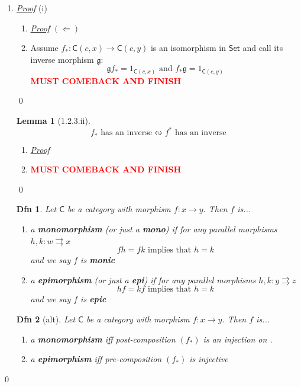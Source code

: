 \documentclass{article}
\theoremstyle{spacious}
\newtheorem*{dfn}{Dfn}
\newtheorem*{lem}{Lemma}
\newenvironment{pf}{\begin{enumerate} \item[] \textit{\underline{Proof}} }{\end{enumerate}\qed}
\renewcommand{\:}{\vcentcolon=} %
\begin{document}
\begin{pf}{(i)}
\begin{pf} \(\left(\Leftarrow\right)\)
    \item[] Assume  \(f_*:\mathsf{C}(c,x) \to \mathsf{C}(c,y)\) is an isomorphism in \(\mathsf{Set}\) and call its inverse morphism $\mathfrak{g}$:
    \[
    \mathfrak{g}f_*=1_{\mathsf{C}\left(c,x\right)} \text{ and } f_*\mathfrak{g}=1_{\mathsf{C}\left(c,y\right)}
    \]  
    {\textcolor{red}{\textbf{MUST COMEBACK AND FINISH}}}
\end{pf}

\begin{lem}[1.2.3.ii]
    \[
        f_* \text{ has an inverse} \leftrightsquigarrow f^* \text{ has an inverse}
    \]
\end{lem}

\begin{pf}{}
    \item[] {\textcolor{red}{\textbf{MUST COMEBACK AND FINISH}}}
\end{pf}

\begin{dfn} Let \(\mathsf{C}\) be a category with morphism \(f:x \to y\).  Then $f$ is...
    \begin{enumerate}
        \item a \textbf{monomorphism} (or just a \textbf{mono}) if for any parallel morphisms $h,k:w \rightrightarrows x$
        \[
            fh=fk \text{ implies that } h=k
        \]
        and we say $f$ is \textbf{monic}
        \item a \textbf{epimorphism} (or just a \textbf{epi}) if for any parallel morphisms $h,k:y \rightrightarrows z$
        \[
            hf=kf \text{ implies that } h=k
        \]
        and we say $f$ is \textbf{epic}
    \end{enumerate}
\end{dfn}

\begin{dfn}[alt] Let \(\mathsf{C}\) be a category with morphism \(f:x \to y\).  Then $f$ is...
    \begin{enumerate}
        \item a \textbf{monomorphism} iff post-composition
        \(
            \left(f_*\right)
        \)
        is an injection on .
        \item a \textbf{epimorphism} iff pre-composition 
        \(\left(f_*\right)\) is injective
    \end{enumerate}
\end{dfn}


\end{pf}
\end{document}
